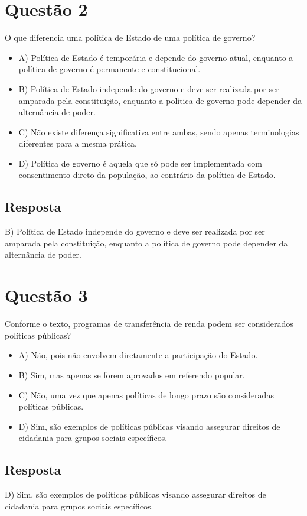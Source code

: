 \documentclass[
   article,       
   12pt,          
   oneside,       
   a4paper,       
   english,       
   brazil,        
   sumario=tradicional
   ]{abntex2}
\begin{document}
\section{Questão 2}
O que diferencia uma política de Estado de uma política de governo?
\begin{itemize}
    \item {A) Política de Estado é temporária e depende do governo atual, enquanto a política de governo é permanente e constitucional.}
    \item {B) Política de Estado independe do governo e deve ser realizada por ser amparada pela constituição, enquanto a política de governo pode depender da alternância de poder.}
    \item {C) Não existe diferença significativa entre ambas, sendo apenas terminologias diferentes para a mesma prática.}
    \item {D) Política de governo é aquela que só pode ser implementada com consentimento direto da população, ao contrário da política de Estado.}
\end{itemize}

\subsection{Resposta}
B) Política de Estado independe do governo e deve ser realizada por ser amparada pela constituição, enquanto a política de governo pode depender da alternância de poder.

\section{Questão 3}
Conforme o texto, programas de transferência de renda podem ser considerados políticas públicas?
\begin{itemize}
    \item {A) Não, pois não envolvem diretamente a participação do Estado.}
    \item {B) Sim, mas apenas se forem aprovados em referendo popular.}
    \item {C) Não, uma vez que apenas políticas de longo prazo são consideradas políticas públicas.}
    \item {D) Sim, são exemplos de políticas públicas visando assegurar direitos de cidadania para grupos sociais específicos.}
\end{itemize}

\subsection{Resposta}
D) Sim, são exemplos de políticas públicas visando assegurar direitos de cidadania para grupos sociais específicos.
\end{document}
